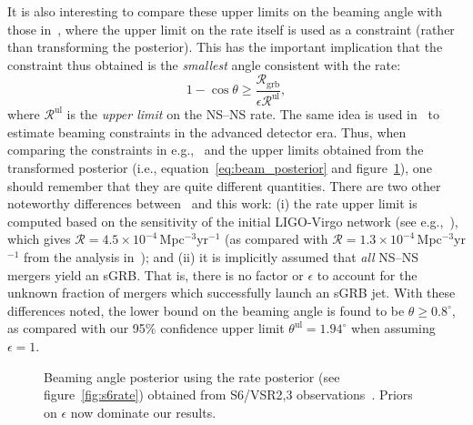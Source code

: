 \documentclass[twocolumn,nofootinbib]{revtex4-1}
\newcommand{\grbrate}{{{\mathcal R}_{\mathrm{grb}}}}
\newcommand{\cbcrate}{{{\mathcal R}}}
\newcommand{\BNS}{\ac{NS}--\ac{NS}\xspace}
\begin{document}
It is also interesting to compare these upper limits on the beaming angle with those in~\cite{2013PhRvL.111r1101C}, where the upper limit on the rate itself is used as a constraint (rather than transforming the posterior).
This has the important implication that the constraint thus obtained is the \emph{smallest} angle consistent with the rate:
%
\begin{equation}
    1 - \cos \theta \geq \frac{\grbrate}{\epsilon \cbcrate^{\mathrm{ul}}},
\end{equation}
%
where $\cbcrate^{\mathrm{ul}}$ is the \emph{upper limit} on the \BNS rate.
The same idea is used in~\cite{Clark:2014jpa} to estimate beaming constraints in the advanced detector era.
Thus, when comparing the constraints in e.g.,~\cite{2013PhRvL.111r1101C} and the upper limits obtained from the transformed posterior (i.e., equation~\ref{eq:beam_posterior} and figure~\ref{fig:s6angle}), one should remember that they are quite different quantities.
There are two other noteworthy differences between~\cite{2013PhRvL.111r1101C} and this work: (i) the rate upper limit is computed based on the sensitivity of the initial LIGO-Virgo network (see e.g.,~\cite{BradyFairhurst08}), which gives $\cbcrate=4.5\times 10^{-4}$\,Mpc$^{-3}$yr$^{-1}$ (as compared with $\cbcrate=1.3 \times 10^{-4}$\,Mpc$^{-3}$yr$^{-1}$ from the analysis in~\cite{Colaboration:2011np}); and (ii) it is implicitly assumed that \emph{all} \BNS mergers yield an \ac{sGRB}.
That is, there is no factor or $\epsilon$ to account for the unknown fraction of mergers which successfully launch an \ac{sGRB} jet.
With these differences noted, the lower bound on the beaming angle is found to be $\theta \geq 0.8^{\circ}$, as compared with our 95\% confidence upper limit $\theta^{\mathrm{ul}}=1.94^{\circ}$ when assuming $\epsilon=1$.

\begin{figure}
\centering
\caption{Beaming angle posterior using the rate posterior (see figure~\ref{fig:s6rate}) obtained from S6/VSR2,3 observations~\cite{Colaboration:2011np}.
    Priors on $\epsilon$ now dominate our results.
    \label{fig:s6angle}}
\end{figure}
\end{document}
